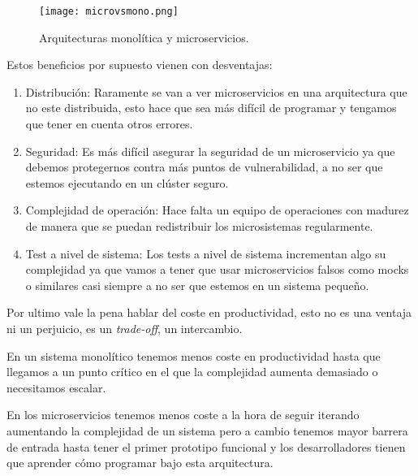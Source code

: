 \begin{figure}
	\centering
	\texttt{[image: microvsmono.png]}
	\caption{Arquitecturas monolítica y microservicios.}\label{fig:microvsmono.png}
\end{figure}

Estos beneficios por supuesto vienen con desventajas:

\begin{enumerate}
\item Distribución: Raramente se van a ver microservicios en una arquitectura que no este distribuida, esto hace que sea más difícil de programar y tengamos que tener en cuenta otros errores.
\item Seguridad: Es más difícil asegurar la seguridad de un microservicio ya que debemos protegernos contra más puntos de vulnerabilidad, a no ser que estemos ejecutando en un clúster seguro.
\item Complejidad de operación: Hace falta un equipo de operaciones con madurez de manera que se puedan redistribuir los microsistemas regularmente.
\item Test a nivel de sistema: Los tests a nivel de sistema incrementan algo su complejidad ya que vamos a tener que usar microservicios falsos como mocks o similares casi siempre a no ser que estemos en un sistema pequeño.
\end{enumerate}

Por ultimo vale la pena hablar del coste en productividad, esto no es una ventaja ni un perjuicio, es un \textit{trade-off}, un intercambio.

En un sistema monolítico tenemos menos coste en productividad hasta que llegamos a un punto crítico en el que la complejidad aumenta demasiado o necesitamos escalar.

En los microservicios tenemos menos coste a la hora de seguir iterando aumentando la complejidad de un sistema pero a cambio tenemos mayor barrera de entrada hasta tener el primer prototipo funcional y los desarrolladores tienen que aprender cómo programar bajo esta arquitectura.
